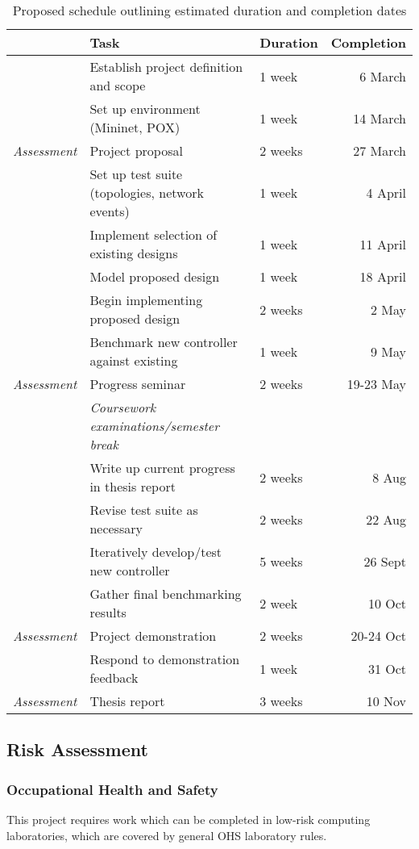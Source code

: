 \documentclass[pdftex,12pt,a4paper]{article}
\begin{document}
\begin{table}[H]
	\begin{center}
		\begin{tabular}{@{}rllr@{}}
			\toprule
			& Task & Duration & Completion\\
			\midrule
			& Establish project definition and scope & 1 week & 6 March \\
			& Set up environment (Mininet,  POX) & 1 week & 14 March \\
			\emph{Assessment} & Project proposal & 2 weeks & 27 March \\
			& Set up test suite (topologies, network events) & 1 week & 4 April \\
			& Implement selection of existing designs & 1 week & 11 April \\
			& Model proposed design & 1 week & 18 April \\
			& Begin implementing proposed design & 2 weeks & 2 May \\
			& Benchmark new controller against existing & 1 week & 9 May \\
			\emph{Assessment} & Progress seminar & 2 weeks & 19-23 May \\
			\addlinespace
			& \emph{Coursework examinations/semester break} \\
			\addlinespace
			& Write up current progress in thesis report & 2 weeks & 8 Aug\\
			& Revise test suite as necessary & 2 weeks & 22 Aug\\
			& Iteratively develop/test new controller & 5 weeks & 26 Sept\\
			& Gather final benchmarking results & 2 week & 10 Oct \\
			\emph{Assessment} & Project demonstration & 2 weeks & 20-24 Oct \\
			& Respond to demonstration feedback & 1 week & 31 Oct \\
			\emph{Assessment} & Thesis report & 3 weeks & 10 Nov \\
			\bottomrule
		\end{tabular}
		\caption{Proposed schedule outlining estimated duration and completion dates}
		\label{table:schedule}
	\end{center}
\end{table}

\subsection{Risk Assessment}
\subsubsection{Occupational Health and Safety}
This project requires work which can be completed in low-risk computing laboratories, which are covered by general OHS laboratory rules.
\end{document}
